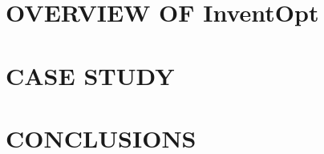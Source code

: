 \documentclass[a4paper,twoside]{article}
\begin{document}
\section{\uppercase{Overview of} InventOpt}
\label{sec:proposedtool}


\section{\uppercase{Case Study}}
\label{sec:casestudy}


\section{\uppercase{Conclusions}}
\label{sec:results}


 
{\small }
\end{document}
